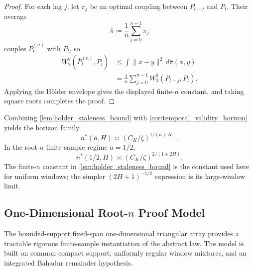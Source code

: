 \begin{proof}
For each lag $j$, let $\pi_j$ be an optimal coupling between $P_{t-j}$ and $P_t$.
Their average
\[
  \bar \pi \coloneqq \frac{1}{n}\sum_{j=0}^{n-1} \pi_j
\]
couples $\bar P_t^{(n)}$ with $P_t$, so
\[
  \begin{aligned}
  W_2^2\!\left(\bar P_t^{(n)},P_t\right)
  &\le \int \|x-y\|^2\,d\bar\pi(x,y) \\
  &= \frac{1}{n}\sum_{j=0}^{n-1} W_2^2\!\left(P_{t-j},P_t\right).
  \end{aligned}
\]
Applying the Hölder envelope gives the displayed finite-$n$ constant, and taking
square roots completes the proof.
\end{proof}

Combining \cref{lem:holder_staleness_bound} with
\cref{cor:temporal_validity_horizon} yields the horizon family
\[
  n^*(a,H) \asymp (C_K/\zeta)^{1/(a+H)}.
\]
In the root-$n$ finite-sample regime $a=1/2$,
\[
  n^*(1/2,H) \asymp (C_K/\zeta)^{2/(1+2H)}.
\]
The finite-$n$ constant in
\cref{lem:holder_staleness_bound} is the constant used here for
uniform windows; the simpler $(2H+1)^{-1/2}$ expression is its large-window
limit.

\subsection{One-Dimensional Root-$n$ Proof Model}
\label{subsec:one_dimensional_proof_model}

The bounded-support fixed-span one-dimensional triangular array provides a
tractable rigorous finite-sample instantiation of the abstract law. The model is
built on common compact support, uniformly regular window mixtures, and an
integrated Bahadur remainder hypothesis.

